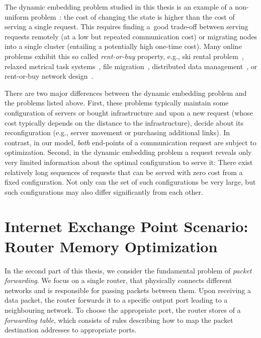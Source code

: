 The dynamic embedding problem studied in this thesis is an example of a non-uniform problem~\cite{KaMaMO94}: the
cost of changing the state is higher than the cost of serving a single
request. This requires finding a~good trade-off between serving requests
remotely (at a low but repeated communication cost) or migrating nodes into a
single cluster (entailing a potentially high one-time cost). Many
online problems exhibit this so called \emph{rent-or-buy} property, e.g., ski
rental problem~\cite{KaMaMO94,LoPaRa08}, relaxed metrical task
systems~\cite{BaChIn01}, file migration~\cite{BaChIn01,BiByMu17}, distributed
data management~\cite{BaFiRa95,AwBaFi93,AwBaFi98}, or rent-or-buy network
design~\cite{AwAzBa04,Umboh15,FeWiLe16}.

There are two major differences between the dynamic embedding problem and the problems listed above.
First, these problems typically maintain some configuration of servers or
bought infrastructure and upon a new request (whose cost typically depends on
the distance to the infrastructure), decide about its reconfiguration (e.g.,
server movement or purchasing additional links). In contrast, in our model,
\emph{both} end-points of a communication request are subject to optimization.
Second, in the dynamic embedding problem a request reveals only very limited information
about the optimal configuration to serve it: There exist relatively long
sequences of requests that can be served with zero cost from a fixed
configuration. Not only can the set of such configurations be very large, but
such configurations may also differ significantly from each other.



\section{Internet Exchange Point Scenario: Router Memory Optimization}
\label{sec:intro-packet-forwarding}

In the second part of this thesis, we consider the fundamental problem of \emph{packet forwarding}.
We focus on a single router, that physically connects different networks and is responsible for passing packets between them.
Upon receiving a data packet, the router forwards it to a specific output port leading to a neighbouring network.
To choose the appropriate port, the router stores of a \emph{forwarding table}, which consists of rules describing how to map the packet destination addresses to appropriate ports.

